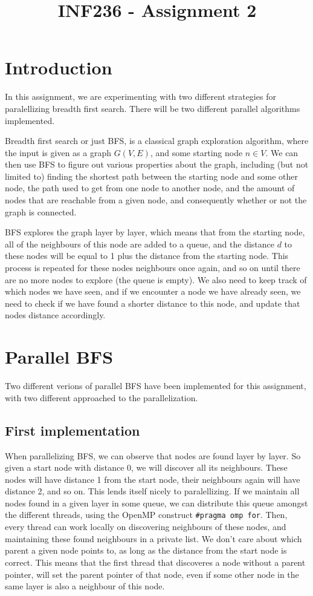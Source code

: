 \documentclass{article}
\title{INF236 - Assignment 2}
\begin{document}
\maketitle
\newpage
\tableofcontents
\newpage
\section{Introduction}
In this assignment, we are experimenting with two different strategies for paralellizing breadth first search. There will be two different parallel algorithms implemented.
\medskip

Breadth first search or just BFS, is a classical graph exploration algorithm, where the input is given as a graph \( G\left( V,E \right) \), and some starting node \( n \in V \). We can then use BFS to figure out various properties about the graph, including (but not limited to) finding the shortest path between the starting node and some other node, the path used to get from one node to another node, and the amount of nodes that are reachable from a given node, and consequently whether or not the graph is connected. 
\medskip

BFS explores the graph layer by layer, which means that from the starting node, all of the neighbours of this node are added to a queue, and the distance \( d \) to these nodes will be equal to 1 plus the distance from the starting node. This process is repeated for these nodes neighbours once again, and so on until there are no more nodes to explore (the queue is empty). We also need to keep track of which nodes we have seen, and if we encounter a node we have already seen, we need to check if we have found a shorter distance to this node, and update that nodes distance accordingly.

\section{Parallel BFS}
Two different verions of parallel BFS have been implemented for this assignment, with two different approached to the parallelization.

\subsection{First implementation}
When parallelizing BFS, we can observe that nodes are found layer by layer. So given a start node with distance 0, we will discover all its neighbours. These nodes will have distance 1 from the start node, their neighbours again will have distance 2, and so on. This lends itself nicely to paralellizing. If we maintain all nodes found in a given layer in some queue, we can distribute this queue amongst the different threads, using the OpenMP construct \texttt{\#pragma omp for}. Then, every thread can work locally on discovering neighbours of these nodes, and maintaining these found neighbours in a private list. We don't care about which parent a given node points to, as long as the distance from the start node is correct. This means that the first thread that discoveres a node without a parent pointer, will set the parent pointer of that node, even if some other node in the same layer is also a neighbour of this node.
\medskip
\end{document}
